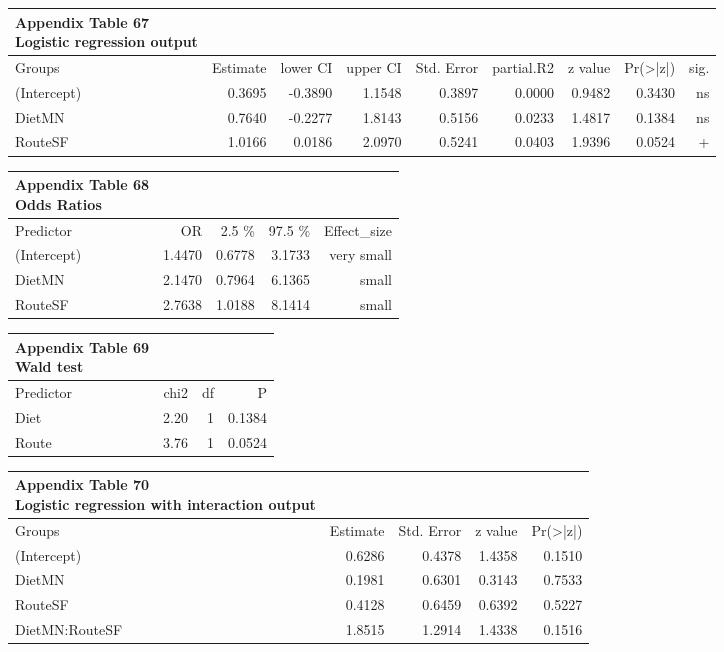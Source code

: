 \documentclass[
  12pt,
  letterpaper,
]{article}
\begin{document}
\begin{longtable}{l|rrrrrrrr}
\caption*{
{\large \textbf{Appendix Table 67}} \\ 
{\small \textbf{Logistic regression output}}
} \\ 
\toprule
\multicolumn{1}{l}{Groups} & Estimate & lower CI & upper CI & Std. Error & partial.R2 & z value & Pr(>|z|) & sig. \\ 
\midrule\addlinespace[2.5pt]
(Intercept) & 0.3695 & -0.3890 & 1.1548 & 0.3897 & 0.0000 & 0.9482 & 0.3430 & ns \\ 
DietMN & 0.7640 & -0.2277 & 1.8143 & 0.5156 & 0.0233 & 1.4817 & 0.1384 & ns \\ 
RouteSF & 1.0166 & 0.0186 & 2.0970 & 0.5241 & 0.0403 & 1.9396 & 0.0524 & + \\ 
\bottomrule
\end{longtable}

\begin{longtable}{l|rrrr}
\caption*{
{\large \textbf{Appendix Table 68}} \\ 
{\small \textbf{Odds Ratios}}
} \\ 
\toprule
\multicolumn{1}{l}{Predictor} & OR & 2.5 \% & 97.5 \% & Effect\_size \\ 
\midrule\addlinespace[2.5pt]
(Intercept) & 1.4470 & 0.6778 & 3.1733 & very small \\ 
DietMN & 2.1470 & 0.7964 & 6.1365 & small \\ 
RouteSF & 2.7638 & 1.0188 & 8.1414 & small \\ 
\bottomrule
\end{longtable}

\begin{longtable}{l|rrr}
\caption*{
{\large \textbf{Appendix Table 69}} \\ 
{\small \textbf{Wald test}}
} \\ 
\toprule
\multicolumn{1}{l}{Predictor} & chi2 & df & P \\ 
\midrule\addlinespace[2.5pt]
Diet & 2.20 & 1 & 0.1384 \\ 
Route & 3.76 & 1 & 0.0524 \\ 
\bottomrule
\end{longtable}

\begin{longtable}{l|rrrr}
\caption*{
{\large \textbf{Appendix Table 70}} \\ 
{\small \textbf{Logistic regression with interaction output}}
} \\ 
\toprule
\multicolumn{1}{l}{Groups} & Estimate & Std. Error & z value & Pr(>|z|) \\ 
\midrule\addlinespace[2.5pt]
(Intercept) & 0.6286 & 0.4378 & 1.4358 & 0.1510 \\ 
DietMN & 0.1981 & 0.6301 & 0.3143 & 0.7533 \\ 
RouteSF & 0.4128 & 0.6459 & 0.6392 & 0.5227 \\ 
DietMN:RouteSF & 1.8515 & 1.2914 & 1.4338 & 0.1516 \\ 
\bottomrule
\end{longtable}
\end{document}
